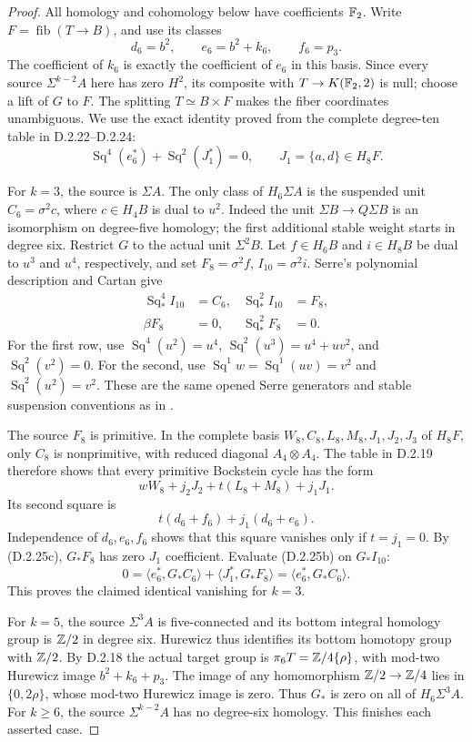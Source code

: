 \begin{proof}
All homology and cohomology below have coefficients $\mathbb F_2$.
Write $F=\operatorname{fib}(T\to B)$, and use its classes
\[
 d_6=b^2,\qquad e_6=b^2+k_6,\qquad f_6=p_3.
\]
The coefficient of $k_6$ is exactly the coefficient of $e_6$
in this basis.  Since every source $\Sigma^{k-2}A$ here has
zero $H^2$, its composite with $T\to K(\mathbb F_2,2)$ is null;
choose a lift of $G$ to $F$.
The splitting $T\simeq B\times F$ makes the fiber
coordinates unambiguous.  We use the exact identity proved
from the complete degree-ten table in D.2.22--D.2.24:
\[
 \operatorname{Sq}^4(e_6^*)+
           \operatorname{Sq}^2(J_1^*)=0,
       \qquad J_1=\{a,d\}\in H_8F.
 \tag{D.2.25b}
\]

For $k=3$, the source is $\Sigma A$.
The only class of $H_6\Sigma A$ is the suspended unit
$C_6=\sigma^2c$, where $c\in H_4B$ is dual to $u^2$.
Indeed the unit $\Sigma B\to Q\Sigma B$ is an isomorphism
on degree-five homology; the first additional stable weight
starts in degree six.
Restrict $G$ to the actual unit $\Sigma^2B$.
Let $f\in H_6B$ and $i\in H_8B$ be dual to $u^3$ and
$u^4$, respectively, and set
$F_8=\sigma^2f$, $I_{10}=\sigma^2i$.
Serre's polynomial description and Cartan give
\[
 \begin{aligned}
 \operatorname{Sq}_*^4 I_{10}&=C_6,
       &\operatorname{Sq}_*^2 I_{10}&=F_8,\\
 \beta F_8&=0,
       &\operatorname{Sq}_*^2 F_8&=0.
 \end{aligned}
 \tag{D.2.25c}
\]
For the first row, use
$\operatorname{Sq}^4(u^2)=u^4$,
$\operatorname{Sq}^2(u^3)=u^4+uv^2$, and
$\operatorname{Sq}^2(v^2)=0$.
For the second, use
$\operatorname{Sq}^1w=\operatorname{Sq}^1(uv)=v^2$
and $\operatorname{Sq}^2(u^2)=v^2$.
These are the same opened Serre generators and stable
suspension conventions as in
\cite[\S1, nos.~2.2--2.3; \S2, nos.~8--9]{I_Serre1953}.

The source $F_8$ is primitive.  In the complete basis
$W_8,C_8,L_8,M_8,J_1,J_2,J_3$ of $H_8F$, only $C_8$
is nonprimitive, with reduced diagonal $A_4\otimes A_4$.
The table in D.2.19 therefore shows that every primitive
Bockstein cycle has the form
\[
 wW_8+j_2J_2+t(L_8+M_8)+j_1J_1.
\]
Its second square is
\[
 t(d_6+f_6)+j_1(d_6+e_6).
\]
Independence of $d_6,e_6,f_6$ shows that this square
vanishes only if $t=j_1=0$.
By \textup{(D.2.25c)}, $G_*F_8$ has zero $J_1$
coefficient.  Evaluate \textup{(D.2.25b)} on $G_*I_{10}$:
\[
 0=\langle e_6^*,G_*C_6\rangle+
           \langle J_1^*,G_*F_8\rangle
   =\langle e_6^*,G_*C_6\rangle.
 \tag{D.2.25d}
\]
This proves the claimed identical vanishing for $k=3$.

For $k=5$, the source $\Sigma^3A$ is five-connected and
its bottom integral homology group is $\mathbb Z/2$ in degree six.
Hurewicz thus identifies its bottom homotopy group with
$\mathbb Z/2$.  By D.2.18 the actual target group is
$\pi_6T=\mathbb Z/4\{\rho\}$, with mod-two Hurewicz image
$b^2+k_6+p_3$.
The image of any homomorphism $\mathbb Z/2\to\mathbb Z/4$ lies in
$\{0,2\rho\}$, whose mod-two Hurewicz image is zero.
Thus $G_*$ is zero on all of $H_6\Sigma^3A$.
For $k\ge6$, the source $\Sigma^{k-2}A$ has no
degree-six homology.  This finishes each asserted case.
\end{proof}
